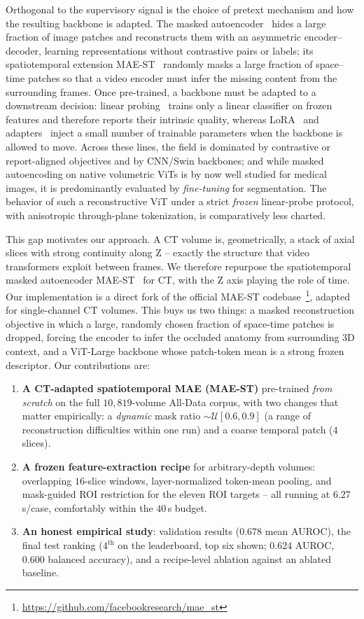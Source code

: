 \documentclass[runningheads]{llncs}
\begin{document}
Orthogonal to the supervisory signal is the choice of pretext mechanism and how
the resulting backbone is adapted. The masked autoencoder~\cite{mae} hides a
large fraction of image patches and reconstructs them with an asymmetric
encoder--decoder, learning representations without contrastive pairs or labels;
its spatiotemporal extension MAE-ST~\cite{maest} randomly masks a large fraction
of space--time patches so that a video encoder must infer the missing content
from the surrounding frames.
Once pre-trained, a backbone must be adapted to a downstream decision: linear
probing~\cite{linearprobing} trains only a linear classifier on frozen features
and therefore reports their intrinsic quality, whereas LoRA~\cite{lora} and
adapters~\cite{adapter} inject a small number of trainable parameters when the
backbone is allowed to move. Across these lines, the field is dominated by
contrastive or report-aligned objectives and by CNN/Swin backbones; and while
masked autoencoding on native volumetric ViTs is by now well studied for medical
images, it is predominantly evaluated by \emph{fine-tuning} for segmentation. The
behavior of such a reconstructive ViT under a strict \emph{frozen} linear-probe
protocol, with anisotropic through-plane tokenization, is comparatively less
charted.

This gap motivates our approach. A CT volume is, geometrically, a stack of axial
slices with strong continuity along Z -- exactly the structure that video
transformers exploit between frames. We therefore repurpose the spatiotemporal
masked autoencoder MAE-ST~\cite{maest} for CT, with the Z axis playing the role
of time. Our implementation is a direct fork of the official MAE-ST
codebase~\cite{maest}\footnote{\url{https://github.com/facebookresearch/mae_st}},
adapted for single-channel CT volumes. This buys us two things: a masked
reconstruction objective in which a large, randomly chosen fraction of
space-time patches is dropped, forcing the encoder to infer the occluded anatomy
from surrounding 3D context, and a ViT-Large backbone whose patch-token mean is a
strong frozen descriptor. Our contributions are:
\begin{enumerate}
  \item \textbf{A CT-adapted spatiotemporal MAE (MAE-ST)} pre-trained
        \emph{from scratch} on the full $10{,}819$-volume All-Data corpus, with
        two changes that matter empirically: a \emph{dynamic} mask ratio
        $\sim\mathcal{U}[0.6,0.9]$ (a range of reconstruction difficulties
        within one run) and a coarse temporal patch ($4$ slices).
  \item \textbf{A frozen feature-extraction recipe} for arbitrary-depth volumes:
        overlapping $16$-slice windows, layer-normalized token-mean pooling, and
        mask-guided ROI restriction for the eleven ROI targets -- all running at
        $6.27$\,s/case, comfortably within the $40$\,s budget.
  \item \textbf{An honest empirical study}: validation results ($0.678$ mean
        AUROC), the final test ranking ($4^{\text{th}}$ on the leaderboard,
        top six shown; $0.624$ AUROC,
        $0.600$ balanced accuracy), and a recipe-level ablation against an
        ablated baseline.
\end{enumerate}
\end{document}
